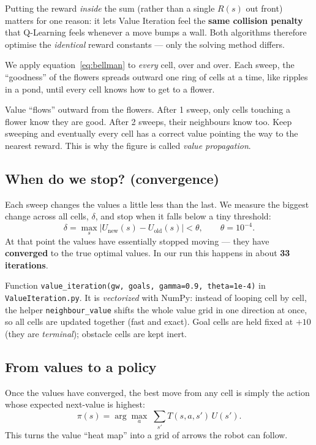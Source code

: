 \documentclass[11pt]{article}
\begin{document}
Putting the reward \emph{inside} the sum (rather than a single $R(s)$ out front)
matters for one reason: it lets Value Iteration feel the \textbf{same collision
penalty} that Q-Learning feels whenever a move bumps a wall. Both algorithms
therefore optimise the \emph{identical} reward constants --- only the solving
method differs.

We apply equation~\eqref{eq:bellman} to \emph{every} cell, over and over. Each
sweep, the ``goodness'' of the flowers spreads outward one ring of cells at a
time, like ripples in a pond, until every cell knows how to get to a flower.

\begin{intuition}
Value ``flows'' outward from the flowers. After 1 sweep, only cells touching a
flower know they are good. After 2 sweeps, their neighbours know too. Keep
sweeping and eventually every cell has a correct value pointing the way to the
nearest reward. This is why the figure is called \emph{value propagation}.
\end{intuition}

\subsection{When do we stop? (convergence)}
Each sweep changes the values a little less than the last. We measure the biggest
change across all cells, $\delta$, and stop when it falls below a tiny threshold:
\[
\delta = \max_s \big| U_{\text{new}}(s) - U_{\text{old}}(s) \big| < \theta,
\qquad \theta = 10^{-4}.
\]
At that point the values have essentially stopped moving --- they have
\textbf{converged} to the true optimal values. In our run this happens in about
\textbf{33 iterations}.

\begin{codebox}
Function \texttt{value\_iteration(gw, goals, gamma=0.9, theta=1e-4)} in
\texttt{ValueIteration.py}. It is \emph{vectorized} with NumPy: instead of
looping cell by cell, the helper \texttt{neighbour\_value} shifts the whole value
grid in one direction at once, so all cells are updated together (fast and
exact). Goal cells are held fixed at $+10$ (they are \emph{terminal}); obstacle
cells are kept inert.
\end{codebox}

\subsection{From values to a policy}
Once the values have converged, the best move from any cell is simply the action
whose expected next-value is highest:
\begin{equation}
\pi(s) = \arg\max_{a}\; \sum_{s'} T(s,a,s')\,U(s').
\end{equation}
This turns the value ``heat map'' into a grid of arrows the robot can follow.
\end{document}
